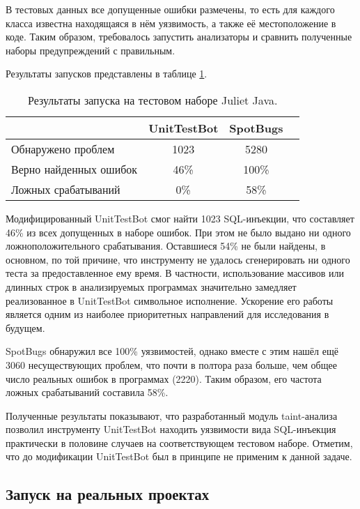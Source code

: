 В тестовых данных все допущенные ошибки размечены, то есть для каждого класса известна находящаяся в нём уязвимость, а также её местоположение в коде. Таким образом, требовалось запустить анализаторы и сравнить полученные наборы предупреждений с правильным.

Результаты запусков представлены в таблице \ref{taint-results}. 

\begin{table}[ht]
\begin{center}
\begin{tabular}{lccc}
    & UnitTestBot & SpotBugs \\
\hline
    Обнаружено проблем     & 1023 & 5280  \\
    Верно найденных ошибок & 46\% & 100\% \\
    Ложных срабатываний    & 0\%  & 58\%  \\
\end{tabular}
\caption{
\label{taint-results} Результаты запуска на тестовом наборе Juliet Java.}
\end{center}
\end{table}

Модифицированный UnitTestBot смог найти 1023 SQL-инъекции, что составляет 46\% из всех допущенных в наборе ошибок. При этом не было выдано ни одного ложноположительного срабатывания. 
Оставшиеся 54\% не были найдены, в основном, по той причине, что инструменту не удалось сгенерировать ни одного теста за предоставленное ему время. В частности, использование массивов или длинных строк в анализируемых программах значительно замедляет реализованное в UnitTestBot символьное исполнение. Ускорение его работы является одним из наиболее приоритетных направлений для исследования в будущем.

SpotBugs обнаружил все 100\% уязвимостей, однако вместе с этим нашёл ещё 3060 несуществующих проблем, что почти в полтора раза больше, чем общее число реальных ошибок в программах (2220). Таким образом, его частота ложных срабатываний составила 58\%.

Полученные результаты показывают, что разработанный модуль taint-анализа позволил инструменту UnitTestBot находить уязвимости вида SQL-инъекция практически в половине случаев на соответствующем тестовом наборе. Отметим, что до модификации UnitTestBot был в принципе не применим к данной задаче.

\subsection{Запуск на реальных проектах}

